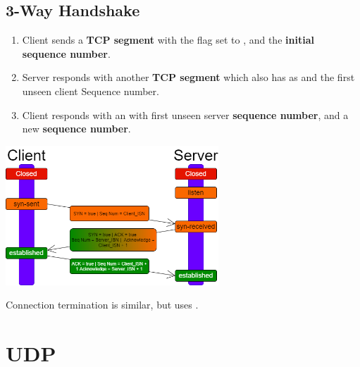 \subsection{3-Way Handshake}
\begin{enumerate}
    \setlength\itemsep{0em}
    \item Client sends a \textbf{TCP segment} with the  flag set to , and the \textbf{initial sequence number}.
    \item Server responds with another  \textbf{TCP segment} which also has  as  and the first unseen client Sequence number.
    \item Client responds with an  with first unseen server \textbf{sequence number}, and a new \textbf{sequence number}.
\end{enumerate}
\begin{center}\includegraphics[width=0.6\textwidth]{transport_layer/images/3 way handshake.png}\end{center}
Connection termination is similar, but uses .

\section{UDP}

